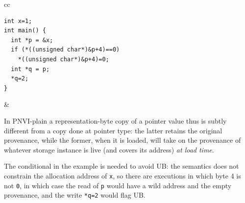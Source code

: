 \documentclass[acmsmall,review,screen]{acmart}\settopmatter{printfolios=true,printccs=false,printacmref=false}
\begin{document}
\begin{center}
  \begin{tabular}{cc}
{\begin{lstlisting}
int x=1;
int main() {
  int *p = &x;
  if (*((unsigned char*)&p+4)==0)
    *((unsigned char*)&p+4)=0;
  int *q = p;
  *q=2;
}
\end{lstlisting}}
&
  \end{tabular}
  \end{center}
In PNVI-plain a representation-byte copy of a pointer value thus is
subtly different from a copy done at pointer type: the latter retains
the original provenance, while the former, when it is loaded, will
take on the provenance of whatever storage instance is live (and covers
its address) \emph{at load time}.  

% 
% 

The conditional in the example is needed to avoid UB: the semantics
does not constrain the allocation
address of \lstinline{x}, so there are executions in which byte 4 is
not \lstinline{0}, in which case the read of \lstinline{p} would have
a wild address and the empty provenance, and the write
\lstinline{*q=2} would flag UB. 
\end{document}
